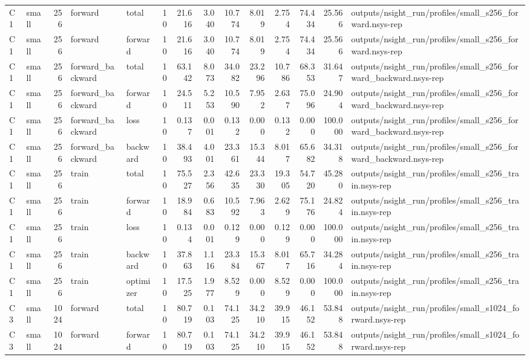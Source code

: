 \begin{tabular}{llrllrrrrrrrrl}
C1 & small & 256 & forward & total & 10 & 21.616 & 3.040 & 10.774 & 8.019 & 2.754 & 74.434 & 25.566 & outputs/nsight\_run/profiles/small\_s256\_forward.nsys-rep \\
C1 & small & 256 & forward & forward & 10 & 21.616 & 3.040 & 10.774 & 8.019 & 2.754 & 74.434 & 25.566 & outputs/nsight\_run/profiles/small\_s256\_forward.nsys-rep \\
C1 & small & 256 & forward\_backward & total & 10 & 63.142 & 8.073 & 34.082 & 23.296 & 10.786 & 68.353 & 31.647 & outputs/nsight\_run/profiles/small\_s256\_forward\_backward.nsys-rep \\
C1 & small & 256 & forward\_backward & forward & 10 & 24.511 & 5.253 & 10.590 & 7.952 & 2.637 & 75.096 & 24.904 & outputs/nsight\_run/profiles/small\_s256\_forward\_backward.nsys-rep \\
C1 & small & 256 & forward\_backward & loss & 10 & 0.137 & 0.001 & 0.132 & 0.000 & 0.132 & 0.000 & 100.000 & outputs/nsight\_run/profiles/small\_s256\_forward\_backward.nsys-rep \\
C1 & small & 256 & forward\_backward & backward & 10 & 38.493 & 4.001 & 23.361 & 15.344 & 8.017 & 65.682 & 34.318 & outputs/nsight\_run/profiles/small\_s256\_forward\_backward.nsys-rep \\
C1 & small & 256 & train & total & 10 & 75.527 & 2.356 & 42.635 & 23.330 & 19.305 & 54.720 & 45.280 & outputs/nsight\_run/profiles/small\_s256\_train.nsys-rep \\
C1 & small & 256 & train & forward & 10 & 18.984 & 0.683 & 10.592 & 7.963 & 2.629 & 75.176 & 24.824 & outputs/nsight\_run/profiles/small\_s256\_train.nsys-rep \\
C1 & small & 256 & train & loss & 10 & 0.134 & 0.001 & 0.129 & 0.000 & 0.129 & 0.000 & 100.000 & outputs/nsight\_run/profiles/small\_s256\_train.nsys-rep \\
C1 & small & 256 & train & backward & 10 & 37.863 & 1.116 & 23.384 & 15.367 & 8.017 & 65.716 & 34.284 & outputs/nsight\_run/profiles/small\_s256\_train.nsys-rep \\
C1 & small & 256 & train & optimizer & 10 & 17.525 & 1.977 & 8.529 & 0.000 & 8.529 & 0.000 & 100.000 & outputs/nsight\_run/profiles/small\_s256\_train.nsys-rep \\
C3 & small & 1024 & forward & total & 10 & 80.719 & 0.103 & 74.125 & 34.210 & 39.915 & 46.152 & 53.848 & outputs/nsight\_run/profiles/small\_s1024\_forward.nsys-rep \\
C3 & small & 1024 & forward & forward & 10 & 80.719 & 0.103 & 74.125 & 34.210 & 39.915 & 46.152 & 53.848 & outputs/nsight\_run/profiles/small\_s1024\_forward.nsys-rep \\

\end{tabular}
